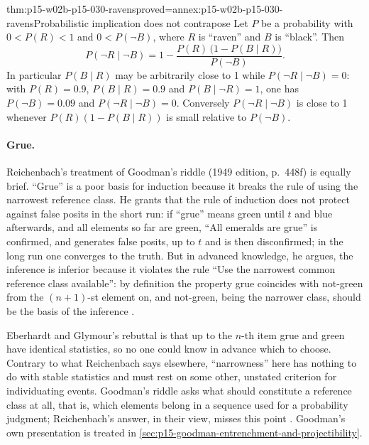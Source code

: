 \begin{hbtheorem}{thm:p15-w02b-p15-030-ravens}{proved=annex:p15-w02b-p15-030-ravens}{Probabilistic implication does not contrapose}
Let \(P\) be a probability with \(0<P(R)<1\) and \(0<P(\neg B)\), where
\(R\) is ``raven'' and \(B\) is ``black''. Then
\[
 P(\neg R\mid\neg B)=1-\frac{P(R)\,\bigl(1-P(B\mid R)\bigr)}{P(\neg B)}.
\]
In particular \(P(B\mid R)\) may be arbitrarily close to 1 while
\(P(\neg R\mid\neg B)=0\): with \(P(R)=0.9\), \(P(B\mid R)=0.9\) and
\(P(B\mid\neg R)=1\), one has \(P(\neg B)=0.09\) and
\(P(\neg R\mid\neg B)=0\). Conversely \(P(\neg R\mid\neg B)\) is close to
1 whenever \(P(R)(1-P(B\mid R))\) is small relative to \(P(\neg B)\).
\end{hbtheorem}

\paragraph{Grue.} Reichenbach's treatment of Goodman's riddle (1949
edition, p.~448f) is equally brief. ``Grue'' is a poor basis for
induction because it breaks the rule of using the narrowest reference
class. He grants that the rule of induction does not protect against
false posits in the short run: if ``grue'' means green until \(t\) and
blue afterwards, and all elements so far are green, ``All emeralds are
grue'' is confirmed, and generates false posits, up to \(t\) and is then
disconfirmed; in the long run one converges to the truth. But in
advanced knowledge, he argues, the inference is inferior because it
violates the rule \enquote{Use the narrowest common reference class
available}: by definition the property grue coincides with not-green
from the \((n+1)\)-st element on, and not-green, being the narrower
class, should be the basis of the inference
\cite[p.~384]{EberhardtGlymour2011ReichenbachReading}.

Eberhardt and Glymour's rebuttal is that up to the \(n\)-th item grue and green have
identical statistics, so no one could know in advance which to choose.
Contrary to what Reichenbach says elsewhere, ``narrowness'' here has
nothing to do with stable statistics and must rest on some other,
unstated criterion for individuating events. Goodman's riddle asks what
should constitute a reference class at all, that is, which elements
belong in a sequence used for a probability judgment; Reichenbach's
answer, in their view, misses this point
\cite[p.~384]{EberhardtGlymour2011ReichenbachReading}. Goodman's own
presentation is treated in
\cref{sec:p15-goodman-entrenchment-and-projectibility}.

